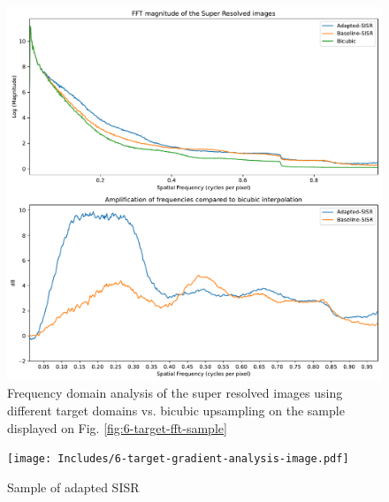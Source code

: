            \begin{figure}[ht!]
                \centering
                \includegraphics[scale=0.5]{Includes/6-target-fft-analysis.pdf}
                \caption{Frequency domain analysis of the super resolved images using different target domains vs. bicubic upsampling on the sample displayed on Fig. \ref{fig:6-target-fft-sample}}
                \label{fig:6-target-fft-analysis}
            \end{figure}


            


            
    
            \begin{figure}[ht!]
                \centering
                \texttt{[image: Includes/6-target-gradient-analysis-image.pdf]}
                \caption{Sample of adapted SISR}
                \label{fig:6-target-gradient-analysis-image}
            \end{figure}

